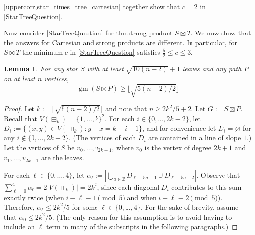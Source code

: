\documentclass{patmorin}
\newcommand{\boxprod}{\mathbin{\Box}}
\renewcommand{\emptyset}{\varnothing}
\renewcommand{\ge}{\geqslant}
\renewcommand{\le}{\leqslant}
\renewcommand{\leq}{\leqslant}
\DeclareMathOperator{\gm}{gm}
\theoremstyle{plain}
\newtheorem{lem}[thm]{Lemma}
\theoremstyle{definition}
\begin{document}
\cref{uppercorr,star_times_tree_cartesian} together show that $c=2$ in \eqref{StarTreeQuestion}. 

Now consider \eqref{StarTreeQuestion} for the strong product $S\boxtimes T$. We now show that the answers for Cartesian and strong products are different. In particular, for $S\boxtimes T$ the minimum $c$ in \eqref{StarTreeQuestion} satisfies $\frac52 \leq c \leq 3$. 

\begin{lem}\label{star_times_tree_strong}
  For any star $S$ with at least $\sqrt{10(n-2)}+1$ leaves and any path $P$ on at least $n$ vertices, $$\gm(S\boxtimes P)\ge \lfloor\sqrt{5(n-2)/2}\rfloor$$
\end{lem}

\begin{proof}
  Let $k:=\lfloor\sqrt{5(n-2)/2}\rfloor$ and note that $n\ge 2k^2/5 + 2$.
  Let $G:=S\boxtimes P$. 
  Recall that $V(\boxplus_k)=\{1,\ldots,k\}^2$.  For each $i\in\{0,\ldots,2k-2\}$, let $D_i:=\{(x,y)\in V(\boxplus_k):y-x=k-i-1\}$,  and for convenience let $D_i=\emptyset$ for any $i\not\in\{0,\ldots,2k-2\}$. %
  (The vertices of each $D_i$ are contained in a line of slope $1$.)  Let the vertices of $S$ be $v_0,\ldots,v_{2k+1}$, where $v_0$ is the vertex of degree $2k+1$ and  $v_1,\ldots,v_{2k+1}$ are the leaves.  

  For each $\ell\in\{0,\ldots,4\}$, let $\alpha_\ell:=|\bigcup_{a\in\mathbb{Z}} D_{\ell+5a+1}\cup D_{\ell+5a+2}|$.  Observe that $\sum_{\ell=0}^4 \alpha_\ell=2|V(\boxplus_k)|=2k^2$, since each diagonal $D_i$ contributes to this sum exactly twice (when $i-\ell\equiv 1\pmod 5$ and when $i-\ell\equiv 2\pmod 5$).  Therefore, $\alpha_\ell\le 2k^2/5$ for some $\ell\in\{0,\ldots,4\}$.  For the sake of brevity, assume that $\alpha_0\le 2k^2/5$.  (The only reason for this assumption is to avoid having to include an $\ell$ term in many of the subscripts in the following paragraphs.)
  


\end{proof}
\end{document}
